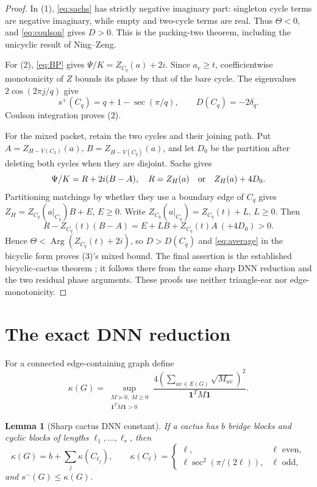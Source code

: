 \documentclass[11pt]{article}
\newtheorem{lemma}[theorem]{Lemma}
\newcommand{\Arg}{\operatorname{Arg}}
\newcommand{\one}{\mathbf 1}
\begin{document}
\begin{proof}
In (1), \eqref{eq:sachs} has strictly negative imaginary part: singleton
cycle terms are negative imaginary, while empty and two-cycle terms are real.
Thus $\Theta<0$, and \eqref{eq:coulson} gives $D>0$.  This is the
packing-two theorem, including the unicyclic result of Ning--Zeng.

For (2), \eqref{eq:BP} gives
$\Psi/K=Z_{C_q}(a)+2i$.  Since $a_v\geq t$, coefficientwise monotonicity of
$Z$ bounds its phase by that of the bare cycle.  The eigenvalues
$2\cos(2\pi j/q)$ give
\begin{equation}\label{eq:cycleformula}
 s^+(C_q)=q+1-\sec(\pi/q),\qquad D(C_q)=-2\delta_q.
\end{equation}
Coulson integration proves (2).

For the mixed packet, retain the two cycles and their joining path.  Put
$A=Z_{H-V(C_3)}(a)$, $B=Z_{H-V(C_q)}(a)$, and let $D_0$ be the partition
after deleting both cycles when they are disjoint.  Sachs gives
\[
 \Psi/K=R+2i(B-A),\quad
 R=Z_H(a)\quad\hbox{or}\quad Z_H(a)+4D_0.
\]
Partitioning matchings by whether they use a boundary edge of $C_q$ gives
$Z_H=Z_{C_q}(a|_{C_q})B+E$, $E\geq0$.  Write
$Z_{C_q}(a|_{C_q})=Z_{C_q}(t)+L$, $L\geq0$.  Then
\[
 R-Z_{C_q}(t)(B-A)=E+LB+Z_{C_q}(t)A\ (+4D_0)>0.
\]
Hence $\Theta<\Arg(Z_{C_q}(t)+2i)$, so
$D>D(C_q)$ and \eqref{eq:average} in the bicyclic form proves (3)'s mixed
bound.  The final assertion is the established bicyclic-cactus theorem
\cite{AllBicyclic}; it follows there from the same sharp DNN reduction and
the two residual phase arguments.  These proofs use neither triangle-ear nor
edge-monotonicity.
\end{proof}

\section{The exact DNN reduction}

For a connected edge-containing graph define
\[
 \kappa(G)=\sup_{\substack{M\succeq0,\ M\geq0\\\one^TM\one>0}}
 \frac{4(\sum_{uv\in E(G)}\sqrt{M_{uv}})^2}{\one^TM\one}.
\]

\begin{lemma}[Sharp cactus DNN constant]\label{lem:dnn}
If a cactus has $b$ bridge blocks and cyclic blocks of lengths
$\ell_1,\ldots,\ell_r$, then
\[
 \kappa(G)=b+\sum_j\kappa(C_{\ell_j}),\qquad
 \kappa(C_\ell)=\begin{cases}\ell,&\ell\text{ even},\\
 \ell\sec^2(\pi/(2\ell)),&\ell\text{ odd},\end{cases}
\]
and $s^-(G)\leq\kappa(G)$.
\end{lemma}
\end{document}
